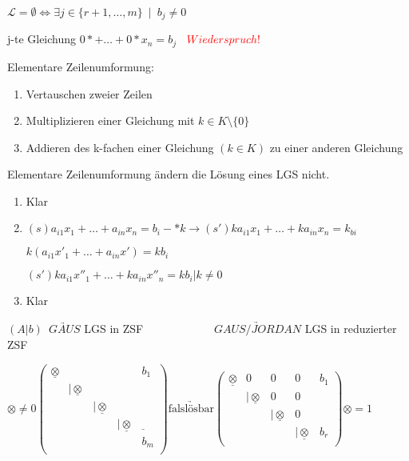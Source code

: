 \documentclass{../tudscript}
\begin{document}
\(\mathcal{L} =\emptyset \Leftrightarrow \exists j \in\{r+1,\dots,m\}\enspace|\enspace b_j \neq 0\)

j-te Gleichung \(0*+\dots+0*x_n = b_j\)
\(\enspace \color {red}{Wiederspruch!}\)

Elementare Zeilenumformung:

\begin{enumerate}
\def\labelenumi{\arabic{enumi}.}
\item
  Vertauschen zweier Zeilen
\item
  Multiplizieren einer Gleichung mit \(k \in K \setminus \{0\}\)
\item
  Addieren des k-fachen einer Gleichung \((k \in K)\) zu einer anderen
  Gleichung
\end{enumerate}

\hypertarget{satz}{%
\label{satz}}

Elementare Zeilenumformung ändern die Lösung eines LGS nicht.

\hypertarget{beweis}{%
\label{beweis}}

\begin{enumerate}
\def\labelenumi{\arabic{enumi}.}
\item
  Klar
\item
  \((s) a_{i1}x_1 + \dots +a_{in}x_n = b_i -*k\rightarrow (s') ka_{i1}x_1 + \dots + ka_{in}x_n =k_{bi}\)

  \(k(a_{i1}x'_1 + \dots + a_{in} x')=kb_i\)

  \((s') ka_{i1}x''_1+\dots+ka_{in}x''_n = kb_i | k \neq 0\)
\item
  Klar
\end{enumerate}

\((A|b)\enspace \underrightarrow{GAUS}\) LGS in ZSF
\({\qquad \qquad \qquad \underrightarrow{GAUS/JORDAN}}\) LGS in
reduzierter ZSF

\({\otimes} \neq 0 \left(\begin{array}{cccc|c}  \underline{\otimes} &&&& b_1\\  &|\underline{\otimes} &&&\\  &&|\underline{\otimes} &&\\  &&&|\underline{\otimes} &\underline{~}\\  &&&& b_m\\ \end{array}\right) \underrightarrow{\text{falslösbar}}\left(\begin{array}{cccc|c}  \underline{\otimes} &0&0&0& b_1\\  &|\underline{\otimes} &0&0&\\  &&|\underline{\otimes} &0&\\  &&&|\underline{\otimes} & b_r\\ \end{array}\right) \otimes= 1\)
\end{document}
